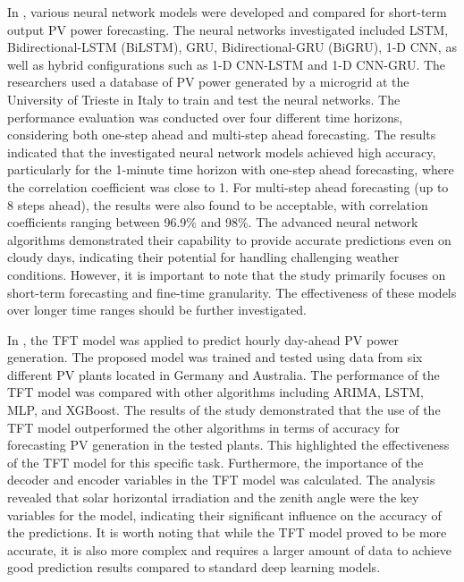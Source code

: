 In \cite{MELLIT2021276}, various neural network models were developed and compared for short-term output PV power forecasting.
The neural networks investigated included LSTM, Bidirectional-LSTM (BiLSTM), GRU, Bidirectional-GRU (BiGRU), 1-D CNN, as well as hybrid configurations such as 1-D CNN-LSTM and 1-D CNN-GRU.
The researchers used a database of PV power generated by a microgrid at the University of Trieste in Italy to train and test the neural networks.
The performance evaluation was conducted over four different time horizons, considering both one-step ahead and multi-step ahead forecasting.
The results indicated that the investigated neural network models achieved high accuracy, particularly for the 1-minute time horizon with one-step ahead forecasting, where the correlation coefficient was close to 1.
For multi-step ahead forecasting (up to 8 steps ahead), the results were also found to be acceptable, with correlation coefficients ranging between 96.9\% and 98\%.
The advanced neural network algorithms demonstrated their capability to provide accurate predictions even on cloudy days, indicating their potential for handling challenging weather conditions.
However, it is important to note that the study primarily focuses on short-term forecasting and fine-time granularity.
The effectiveness of these models over longer time ranges should be further investigated.

In \cite{en15145232}, the TFT model was applied to predict hourly day-ahead PV power generation.
The proposed model was trained and tested using data from six different PV plants located in Germany and Australia.
The performance of the TFT model was compared with other algorithms including ARIMA, LSTM, MLP, and XGBoost.
The results of the study demonstrated that the use of the TFT model outperformed the other algorithms in terms of accuracy for forecasting PV generation in the tested plants.
This highlighted the effectiveness of the TFT model for this specific task.
Furthermore, the importance of the decoder and encoder variables in the TFT model was calculated.
The analysis revealed that solar horizontal irradiation and the zenith angle were the key variables for the model, indicating their significant influence on the accuracy of the predictions.
It is worth noting that while the TFT model proved to be more accurate, it is also more complex and requires a larger amount of data to achieve good prediction results compared to standard deep learning models.
